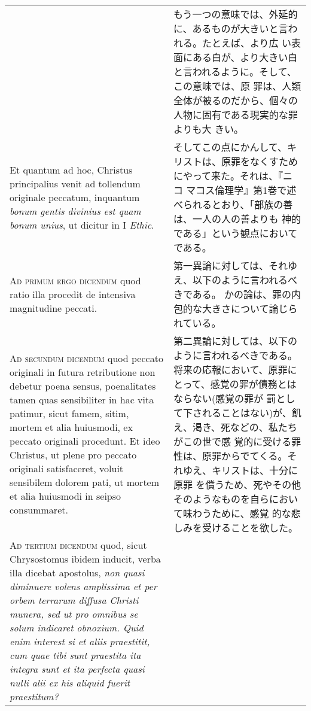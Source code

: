 \documentclass[10pt]{jsarticle} %
\begin{document}
\begin{longtable}{p{21em}p{21em}}
&

もう一つの意味では、外延的に、あるものが大きいと言われる。たとえば、より広
い表面にある白が、より大きい白と言われるように。そして、この意味では、原
 罪は、人類全体が被るのだから、個々の人物に固有である現実的な罪よりも大
 きい。


\\


Et quantum ad
hoc, Christus principalius venit ad tollendum originale peccatum,
inquantum {\itshape bonum gentis divinius est quam bonum unius}, ut dicitur in I
{\itshape Ethic}.

&

そしてこの点にかんして、キリストは、原罪をなくすためにやって来た。それは、『ニコ
 マコス倫理学』第1巻で述べられるとおり、「部族の善は、一人の人の善よりも
 神的である」という観点においてである。


\\



{\scshape Ad primum ergo dicendum} quod ratio illa
procedit de intensiva magnitudine peccati.


&

第一異論に対しては、それゆえ、以下のように言われるべきである。
かの論は、罪の内包的な大きさについて論じられている。


\\


{\scshape Ad secundum dicendum} quod peccato originali
in futura retributione non debetur poena sensus, poenalitates tamen quas
sensibiliter in hac vita patimur, sicut famem, sitim, mortem et alia
huiusmodi, ex peccato originali procedunt. Et ideo Christus, ut plene
pro peccato originali satisfaceret, voluit sensibilem dolorem pati, ut
mortem et alia huiusmodi in seipso consummaret.


&

第二異論に対しては、以下のように言われるべきである。
将来の応報において、原罪にとって、感覚の罪が債務とはならない(感覚の罪が
 罰として下されることはない)が、飢え、渇き、死などの、私たちがこの世で感
 覚的に受ける罪性は、原罪からでてくる。それゆえ、キリストは、十分に原罪
 を償うため、死やその他そのようなものを自らにおいて味わうために、感覚
 的な悲しみを受けることを欲した。



\\


{\scshape Ad tertium dicendum} quod, sicut Chrysostomus
ibidem inducit, verba illa dicebat apostolus, {\itshape non quasi diminuere volens
amplissima et per orbem terrarum diffusa Christi munera, sed ut pro
omnibus se solum indicaret obnoxium. 
Quid enim interest si et aliis
praestitit, cum quae tibi sunt praestita ita integra sunt et ita
perfecta quasi nulli alii ex his aliquid fuerit praestitum? }



\end{longtable}
\end{document}
